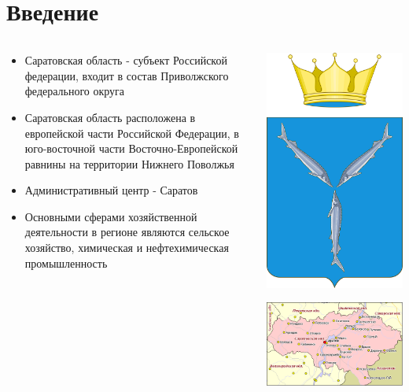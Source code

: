 
\section{Введение}
\begin{frame}{\insertsectionhead}

\begin{columns}[onlytextwidth,T]
  \begin{column}{.55\linewidth}
    \small
    \begin{itemize}
        \item Саратовская область - субъект Российской федерации, входит в состав Приволжского федерального округа
        \item Саратовская область расположена в европейской части Российской Федерации, в юго-восточной части 
        Восточно-Европейской равнины на территории Нижнего Поволжья
        \item Административный центр - Саратов
        \item Основными сферами хозяйственной деятельности в регионе являются сельское хозяйство, химическая и нефтехимическая промышленность
    \end{itemize}
  \end{column}

  \begin{column}{.43\linewidth}
    \begin{center}
        \includegraphics[width=.2\textwidth]{assets/logo.png}
    \end{center}
    \includegraphics[width=\textwidth]{assets/saratov.png}
  \end{column}

\end{columns}
\end{frame}

